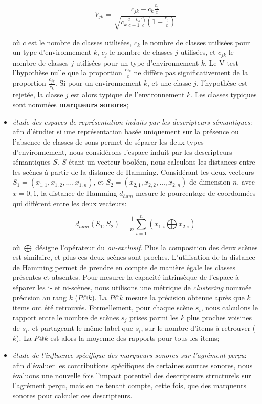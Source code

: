 \begin{itemize}
\begin{equation*}
V_{jk}=\dfrac{c_{jk}-c_k\frac{c_j}{c}}{\sqrt{c_k\frac{c-c_k}{c-1}\frac{c_j}{c}(1-\frac{c_j}{c})}}
\end{equation*}

où $c$ est le nombre de classes utilisées, $c_k$ le nombre de classes utilisées pour un type d'environnement $k$, $c_j$ le nombre de classes $j$ utilisées, et $c_{jk}$ le nombre de classes $j$ utilisées pour un type d'environnement $k$. Le V-test   l'hypothèse nulle que la proportion $\frac{c_{jk}}{c}$ ne diffère pas significativement de la proportion $\frac{c_{jk}}{c_k}$. Si pour un environnement $k$, et une classe $j$, l'hypothèse est rejetée, la classe $j$ est alors typique de l'environnement $k$. Les classes typiques sont nommées \textbf{marqueurs sonores};

\item \emph{étude des espaces de représentation induits par les descripteurs sémantiques}: afin d'étudier si une représentation basée uniquement sur la présence ou l'absence de classes de sons permet de séparer les deux types d'environnement, nous considérons l'espace induit par les descripteurs sémantiques $S$. $S$ étant un vecteur booléen, nous calculons les distances entre les scènes à partir de la distance de Hamming. Considérant les deux vecteurs $S_1=(x_{1,1},x_{1,2},\ldots,x_{1,n})$, et $S_2=(x_{2,1},x_{2,2},\ldots,x_{2,n})$ de dimension $n$, avec $x={0,1}$, la distance de Hamming $d_{ham}$ mesure le pourcentage de coordonnées qui diffèrent entre les deux vecteurs:   


\begin{equation*}
d_{ham}(S_1,S_2)=\dfrac{1}{n}\sum_{i=1}^{n} (x_{1,i} \bigoplus x_{2,i})
\end{equation*}

où $\bigoplus$ désigne l'opérateur du \emph{ou-exclusif}. Plus la composition des deux scènes est similaire, et plus ces deux scènes sont proches. L'utilisation de la distance de Hamming permet de prendre en compte de manière égale les classes présentes et absentes. Pour mesurer la capacité intrinsèque de l'espace à séparer les i- et ni-scènes, nous utilisons une métrique de \emph{clustering} nommée précision au rang $k$ ($P@k$). La $P@k$ mesure la précision obtenue après que $k$ items ont été retrouvés. Formellement, pour chaque scène $s_i$, nous calculons le rapport entre le nombre de scènes $s_j$ prises parmi les $k$ plus proches voisines de $s_i$, et partageant le même label que $s_i$, sur le nombre d'items à retrouver ($k$). La $P@k$ est alors la moyenne des rapports pour tous les items;

\item \emph{étude de l'influence spécifique des marqueurs sonores sur l'agrément perçu}: afin d'évaluer les contributions spécifiques de certaines sources sonores, nous évaluons une nouvelle fois l'impact potentiel des descripteurs structurels sur l'agrément perçu, mais en ne tenant compte, cette fois, que des marqueurs sonores pour calculer ces descripteurs.
\end{itemize}


